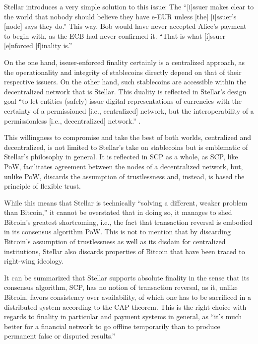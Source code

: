 Stellar introduces a very simple solution to this issue:
The ``[i]ssuer makes clear to the world that nobody should believe they have e-EUR unless [the] [i]ssuer's [node] says they do.'' 
This way, Bob would have never accepted Alice's payment to begin with, as the ECB had never confirmed it.
``That is what [i]ssuer-[e]nforced [f]inality is.''

On the one hand, issuer-enforced finality certainly is a centralized approach, as the operationality and integrity of stablecoins directly depend on that of their respective issuers.
On the other hand, such stablecoins are accessible within the decentralized network that is Stellar.
This duality is reflected in Stellar's design goal ``to let entities (safely) issue digital representations of currencies with the certainty of a permissioned [i.e., centralized] network, but the interoperability of a permissionless [i.e., decentralized] network.'' \autocite{stellar2020ief}.

This willingness to compromise and take the best of both worlds, centralized and decentralized, is not limited to Stellar's take on stablecoins but is emblematic of Stellar's philosophy in general.
It is reflected in SCP as a whole, as SCP, like PoW, facilitates agreement between the nodes of a decentralized network, but, unlike PoW, discards the assumption of trustlessness and, instead, is based the principle of flexible trust.

While this means that Stellar is technically ``solving a different, weaker problem than Bitcoin,'' \autocite{hackernoon2018cryptocurrencyfinality} it cannot be overstated that in doing so, it manages to shed Bitcoin's greatest shortcoming, i.e., the fact that transaction reversal is embodied in its consensus algorithm PoW.
This is not to mention that by discarding Bitcoin's assumption of trustlessness as well as its disdain for centralized institutions, Stellar also discards properties of Bitcoin that have been traced to right-wing ideology.

It can be summarized that Stellar supports absolute finality in the sense that its consensus algorithm, SCP, has no notion of transaction reversal, as it, unlike Bitcoin, favors consistency over availability, of which one has to be sacrificed in a distributed system according to the CAP theorem.
This is the right choice with regards to finality in particular and payment systems in general, as ``it’s much better for a financial network to go offline temporarily than to produce permanent false or disputed results.'' \autocite{stellar2019networkhalt}


